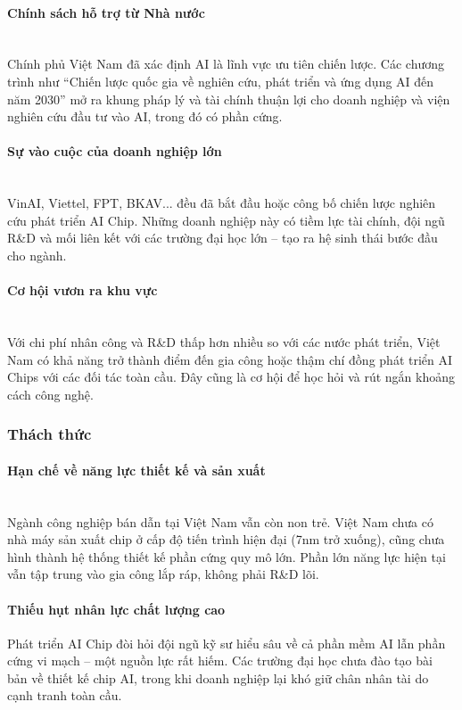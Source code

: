 \documentclass[a4paper]{article}
\begin{document}
\paragraph{Chính sách hỗ trợ từ Nhà nước}\leavevmode\\
Chính phủ Việt Nam đã xác định AI là lĩnh vực ưu tiên chiến lược. Các chương trình như “Chiến lược quốc gia về nghiên cứu, phát triển và ứng dụng AI đến năm 2030” mở ra khung pháp lý và tài chính thuận lợi cho doanh nghiệp và viện nghiên cứu đầu tư vào AI, trong đó có phần cứng.
\paragraph{Sự vào cuộc của doanh nghiệp lớn}\leavevmode\\
VinAI, Viettel, FPT, BKAV... đều đã bắt đầu hoặc công bố chiến lược nghiên cứu phát triển AI Chip. Những doanh nghiệp này có tiềm lực tài chính, đội ngũ R\&D và mối liên kết với các trường đại học lớn – tạo ra hệ sinh thái bước đầu cho ngành.
\paragraph{Cơ hội vươn ra khu vực}\leavevmode\\
Với chi phí nhân công và R\&D thấp hơn nhiều so với các nước phát triển, Việt Nam có khả năng trở thành điểm đến gia công hoặc thậm chí đồng phát triển AI Chips với các đối tác toàn cầu. Đây cũng là cơ hội để học hỏi và rút ngắn khoảng cách công nghệ.
\subsubsection{Thách thức}
\paragraph{Hạn chế về năng lực thiết kế và sản xuất}\leavevmode\\
Ngành công nghiệp bán dẫn tại Việt Nam vẫn còn non trẻ. Việt Nam chưa có nhà máy sản xuất chip ở cấp độ tiến trình hiện đại (7nm trở xuống), cũng chưa hình thành hệ thống thiết kế phần cứng quy mô lớn. Phần lớn năng lực hiện tại vẫn tập trung vào gia công lắp ráp, không phải R\&D lõi.
\paragraph{Thiếu hụt nhân lực chất lượng cao} 
Phát triển AI Chip đòi hỏi đội ngũ kỹ sư hiểu sâu về cả phần mềm AI lẫn phần cứng vi mạch – một nguồn lực rất hiếm. Các trường đại học chưa đào tạo bài bản về thiết kế chip AI, trong khi doanh nghiệp lại khó giữ chân nhân tài do cạnh tranh toàn cầu.
\end{document}
